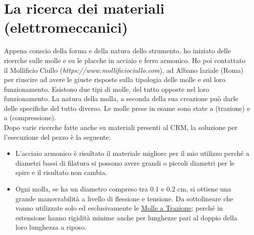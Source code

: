 
\chapter{La ricerca dei materiali (elettromeccanici)}
\label{chp:La ricerca dei materiali (elettromeccanici)}

Appena conscio della forma e della natura dello strumento, ho iniziato delle ricerche sulle molle e su le placche in acciaio e ferro armonico. Ho poi contattato il Mollificio Ciullo (\textit{https://www.mollificiociullo.com}), ad Albano laziale (Roma) per riuscire ad avere le giuste risposte sulla tipologia delle molle e sul loro funzionamento. Esistono due tipi di molle, del tutto opposte nel loro funzionamento. La natura della molla, a seconda della sua creazione può darle delle specifiche del tutto diverso. Le molle prese in esame sono state a (trazione) e a (compressione).  \\
Dopo varie ricerche fatte anche su materiali presenti al CRM, la soluzione per l'esecuzione del pezzo è la seguente:
\begin{itemize}
\item{L'acciaio armonico è risultato il materiale migliore per il mio utilizzo perché a diametri bassi di filatura si possono avere grandi o piccoli diametri per le spire e il risultato non cambia.}
\item{Ogni molla, se ha un diametro compreso tra 0.1 e 0.2 cm, si ottiene una grande manovrabilità a livello di flessione e tensione. Da sottolineare che vanno utilizzate solo ed esclusivamente le \underline {Molle a Trazione}; perché in estensione hanno rigidità minime anche per lunghezze pari al doppio della loro lunghezza a riposo.\\}
\end{itemize}

